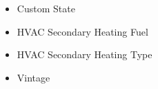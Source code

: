\begin{itemize}
\item Custom State
\item HVAC Secondary Heating Fuel
\item HVAC Secondary Heating Type
\item Vintage
\end{itemize}
